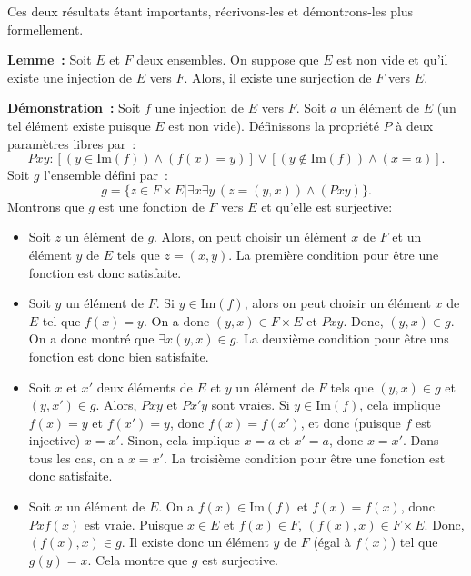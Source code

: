 Ces deux résultats étant importants, récrivons-les et démontrons-les plus formellement.

\medskip

\noindent\textbf{Lemme :} 
Soit $E$ et $F$ deux ensembles. 
On suppose que $E$ est non vide et qu'il existe une injection de $E$ vers $F$. 
Alors, il existe une surjection de $F$ vers $E$. 

\medskip

\noindent\textbf{Démonstration :}
Soit $f$ une injection de $E$ vers $F$. 
Soit $a$ un élément de $E$ (un tel élément existe puisque $E$ est non vide). 
Définissons la propriété $P$ à deux paramètres libres par : 
\begin{equation*}
    P x y: \left[(y \in \mathrm{Im}(f)) \wedge (f(x) = y) \right]
           \vee \left[(y \notin \mathrm{Im}(f)) \wedge (x=a) \right].
\end{equation*}
Soit $g$ l'ensemble défini par : 
\begin{equation*}
    g = \lbrace
        z \in F \times E \vert
        \exists x \exists y \, (z = (y,x)) \wedge (P x y)
    \rbrace .
\end{equation*}
Montrons que $g$ est une fonction de $F$ vers $E$ et qu'elle est surjective: 
\begin{itemize}[nosep]
    \item Soit $z$ un élément de $g$. 
        Alors, on peut choisir un élément $x$ de $F$ et un élément $y$ de $E$ tels que $z = (x,y)$.
        La première condition pour être une fonction est donc satisfaite. 
    \item Soit $y$ un élément de $F$. 
        Si $y \in \mathrm{Im}(f)$, alors on peut choisir un élément $x$ de $E$ tel que $f(x) = y$. 
        On a donc $(y,x) \in F \times E$ et $P x y$. 
        Donc, $(y,x) \in g$. 
        On a donc montré que $\exists x (y,x) \in g$. 
        La deuxième condition pour être uns fonction est donc bien satisfaite.
    \item Soit $x$ et $x'$ deux éléments de $E$ et $y$ un élément de $F$ tels que $(y,x) \in g$ et $(y,x') \in g$.
        Alors, $P x y$ et $P x' y$ sont vraies.
        Si $y \in \mathrm{Im}(f)$, cela implique $f(x) = y$ et $f(x') = y$, donc $f(x) = f(x')$, et donc (puisque $f$ est injective) $x = x'$.
        Sinon, cela implique $x = a$ et $x' = a$, donc $x = x'$.
        Dans tous les cas, on a $x = x'$. 
        La troisième condition pour être une fonction est donc satisfaite. 
    \item Soit $x$ un élément de $E$. On a $f(x) \in \mathrm{Im}(f)$ et $f(x) = f(x)$, donc $P x f(x)$ est vraie. 
        Puisque $x \in E$ et $f(x) \in F$, $(f(x),x) \in F \times E$. 
        Donc, $(f(x),x) \in g$. 
        Il existe donc un élément $y$ de $F$ (égal à $f(x)$) tel que $g(y) = x$. 
        Cela montre que $g$ est surjective.
\end{itemize}

